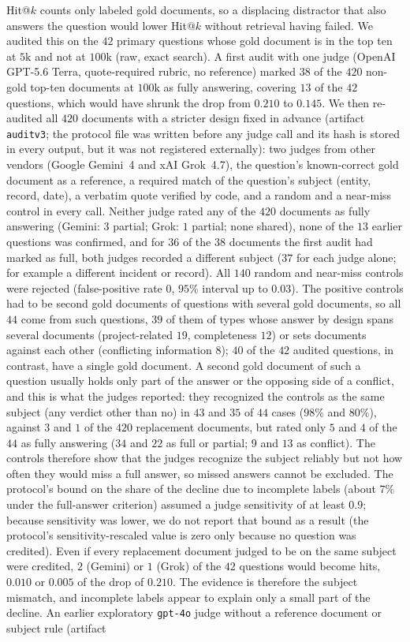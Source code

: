 \documentclass{ieeeaccess}
\makeatletter
\DeclareRobustCommand{\_}{\ifmmode\nfss@text{\textunderscore}\else\textunderscore\allowbreak\fi}
\makeatother
\begin{document}
Hit@$k$ counts only labeled gold documents, so a displacing distractor that also answers the question would lower Hit@$k$ without retrieval having failed. We audited this on the $42$ primary questions whose gold document is in the top ten at $5\text{k}$ and not at $100\text{k}$ (raw, exact search). A first audit with one judge (OpenAI GPT-5.6 Terra, quote-required rubric, no reference) marked $38$ of the $420$ non-gold top-ten documents at $100\text{k}$ as fully answering, covering $13$ of the $42$ questions, which would have shrunk the drop from $0.210$ to $0.145$. We then re-audited all $420$ documents with a stricter design fixed in advance (artifact \texttt{audit\_v3}; the protocol file was written before any judge call and its hash is stored in every output, but it was not registered externally): two judges from other vendors (Google Gemini~4 and xAI Grok~4.7), the question's known-correct gold document as a reference, a required match of the question's subject (entity, record, date), a verbatim quote verified by code, and a random and a near-miss control in every call. Neither judge rated any of the $420$ documents as fully answering (Gemini: $3$ partial; Grok: $1$ partial; none shared), none of the $13$ earlier questions was confirmed, and for $36$ of the $38$ documents the first audit had marked as full, both judges recorded a different subject ($37$ for each judge alone; for example a different incident or record). All $140$ random and near-miss controls were rejected (false-positive rate $0$, $95\%$ interval up to $0.03$). The positive controls had to be second gold documents of questions with several gold documents, so all $44$ come from such questions, $39$ of them of types whose answer by design spans several documents (project-related $19$, completeness $12$) or sets documents against each other (conflicting information $8$); $40$ of the $42$ audited questions, in contrast, have a single gold document. A second gold document of such a question usually holds only part of the answer or the opposing side of a conflict, and this is what the judges reported: they recognized the controls as the same subject (any verdict other than no) in $43$ and $35$ of $44$ cases ($98\%$ and $80\%$), against $3$ and $1$ of the $420$ replacement documents, but rated only $5$ and $4$ of the $44$ as fully answering ($34$ and $22$ as full or partial; $9$ and $13$ as conflict). The controls therefore show that the judges recognize the subject reliably but not how often they would miss a full answer, so missed answers cannot be excluded. The protocol's bound on the share of the decline due to incomplete labels (about $7\%$ under the full-answer criterion) assumed a judge sensitivity of at least $0.9$; because sensitivity was lower, we do not report that bound as a result (the protocol's sensitivity-rescaled value is zero only because no question was credited). Even if every replacement document judged to be on the same subject were credited, $2$ (Gemini) or $1$ (Grok) of the $42$ questions would become hits, $0.010$ or $0.005$ of the drop of $0.210$. The evidence is therefore the subject mismatch, and incomplete labels appear to explain only a small part of the decline. An earlier exploratory \texttt{gpt-4o} judge without a reference document or subject rule (artifact 
\end{document}
